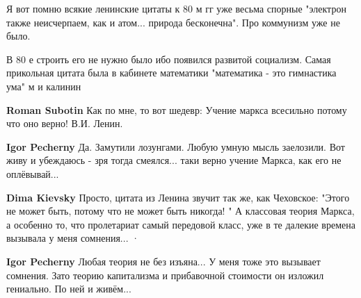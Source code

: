 \begin{itemize}


Я вот помню всякие ленинские цитаты к 80 м гг уже весьма спорные "электрон
также неисчерпаем, как и атом... природа бесконечна". Про коммунизм уже не было.

В 80 е строить его не нужно было ибо появился развитой социализм. Самая
прикольная цитата была в кабинете математики "математика - это гимнастика ума"
м и калинин

\begin{itemize}


\textbf{Roman Subotin} Как по мне, то вот шедевр:
Учение маркса всесильно потому что оно верно!
В.И. Ленин.

\begin{itemize}
 
\textbf{Igor Pecherny} Да. Замутили лозунгами. Любую умную мысль заелозили. Вот
живу и убеждаюсь - зря тогда смеялся... таки верно учение Маркса, как его не
оплёвывай...


 

\textbf{Dima Kievsky} Просто, цитата из Ленина звучит так же, как Чеховское:
"Этого не может быть, потому что не может быть никогда! " А классовая теория
Маркса, а особенно то, что пролетариат самый передовой класс, уже в те далекие
времена вызывала у меня сомнения...  · 


 
\textbf{Igor Pecherny} Любая теория не без изъяна... У меня тоже это вызывает
сомнения. Зато теорию капитализма и прибавочной стоимости он изложил гениально.
По ней и живём...
\end{itemize}


\end{itemize}
\end{itemize}
